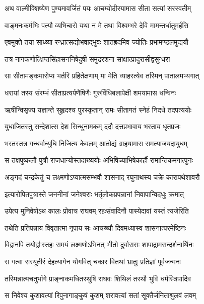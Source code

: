 \twolineshloka
{अथ वाल्मीक्शिष्येण पुण्यमावर्जितं पयः}
{आचम्योदीरयामास सीता सत्यां सरस्वतीम्} %

\twolineshloka
{वाङ्मनःकर्मभिः पत्यौ व्यभिचारो यथा न मे}
{तथा विश्वम्भरे देवि मामन्तर्धातुमर्हसि} %

\twolineshloka
{एवमुक्ते तया साध्व्या रन्ध्रात्सद्योभवाद्भुवः}
{शातह्रदमिव ज्योतिः प्रभामण्डलमुद्ययौ} %

\twolineshloka
{तत्र नागफणोत्क्षिप्तसिंहासननिषेदुषी}
{समुद्ररशना साक्षात्प्रादुरासीद्वसुन्धरा} %

\twolineshloka
{सा सीतामङ्कमारोप्य भर्तरि प्रहितेक्षणाम्}
{मा मेति व्याहरत्येव तस्मिन् पातालमभ्यगात्} %

\twolineshloka
{धरायां तस्य संरम्भं सीताप्रत्यर्पणैषिणैः}
{गुरुर्विधिबलापेक्षी शमयामास धन्विनः} %

\twolineshloka
{ऋषीन्विसृज्य यज्ञान्ते सुहृदश्च पुरस्कृतान्}
{रामः सीतागतं स्नेहं निदधे तदपत्ययोः} %

\twolineshloka
{युधाजितस्तु सन्देशात्स देश सिन्धुनामकम्}
{ददौ दत्तप्रभावाय भरताय धृतप्रजः} %

\twolineshloka
{भरतस्तत्र गन्धर्वान्युधि निजित्य केवलम्}
{आतोद्यं ग्राहयामास समत्याजयदायुधम्} %

\twolineshloka
{स तक्षपुष्कलौ पुत्रौ राजधान्योस्तदाख्ययोः}
{अभिषिच्याभिषेकार्हौ रामान्तिकमगात्पुनः} %

\twolineshloka
{अङ्गदं चन्द्रकेतुं च लक्ष्मणोऽप्यात्मसम्भवौ}
{शासनाद् रघुनाथस्य चक्रे कारापथेशावरौ} %

\twolineshloka
{इत्यारोपितपुत्रास्ते जननीनां जनेश्वराः}
{भर्तृलोकप्रपन्नानां निवापान्विदधुः क्रमात्} %

\twolineshloka
{उपेत्य मुनिवेषोऽथ कालः प्रोवाच राघवम्}
{रहःसंवादिनौ पास्येदावां यस्तं त्यजेरिति} %

\twolineshloka
{तथेति प्रतिपन्नाय विवृतात्मा नृपाय सः}
{आचख्यौ दिवमध्यास्व शासनात्परमेष्ठिनः} %

\twolineshloka
{विद्वानपि तयोर्द्वाःस्तहः समयं लक्ष्मणोऽभिनत्}
{भीतो दुर्वाससः शापाद्रामसन्दर्शनार्थिनः} %

\twolineshloka
{स गत्वा सरयूतीरं देहत्यागेन योगवित्}
{चकार वितथां भ्रातुः प्रतिज्ञां पूर्वजन्मनः} %

\twolineshloka
{तस्मिन्नात्मचतुर्भागे प्राङ्नाकमधितस्थुषि}
{राघवः शिथिलं तस्थौ भुवि धर्मस्त्रिपादिव} %

\twolineshloka
{स निवेश्य कुशावत्यां रिपुनागाङ्कुषं कुशम्}
{शरावत्यां सतां सूक्तैर्जनिताश्रुलवं लवम्} %

